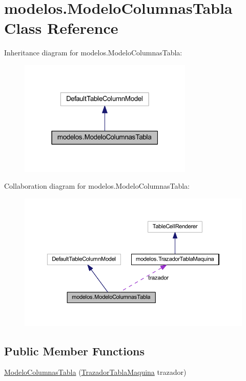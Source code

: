 \hypertarget{classmodelos_1_1_modelo_columnas_tabla}{}\section{modelos.\+Modelo\+Columnas\+Tabla Class Reference}
\label{classmodelos_1_1_modelo_columnas_tabla}


Inheritance diagram for modelos.\+Modelo\+Columnas\+Tabla\+:
\nopagebreak
\begin{figure}[H]
\begin{center}
\leavevmode
\includegraphics[width=235pt]{classmodelos_1_1_modelo_columnas_tabla__inherit__graph}
\end{center}
\end{figure}


Collaboration diagram for modelos.\+Modelo\+Columnas\+Tabla\+:
\nopagebreak
\begin{figure}[H]
\begin{center}
\leavevmode
\includegraphics[width=350pt]{classmodelos_1_1_modelo_columnas_tabla__coll__graph}
\end{center}
\end{figure}
\subsection*{Public Member Functions}
\begin{DoxyCompactItemize}
\item 
\mbox{\hyperlink{classmodelos_1_1_modelo_columnas_tabla_a1ac636f1d60b6abb63e86834e6c8f09d}{Modelo\+Columnas\+Tabla}} (\mbox{\hyperlink{classmodelos_1_1_trazador_tabla_maquina}{Trazador\+Tabla\+Maquina}} trazador)
\end{DoxyCompactItemize}


